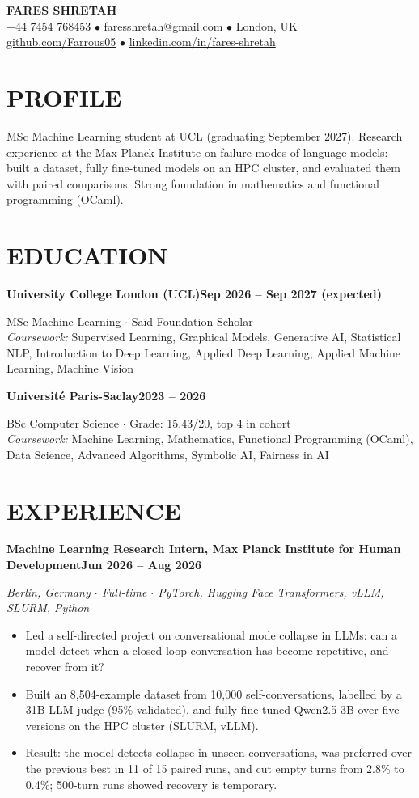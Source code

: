 \documentclass[10pt, a4paper]{article}
\newcommand{\entry}[2]{\vspace{5pt}\textbf{#1}\hfill\textbf{#2}\par}
\newcommand{\sub}[1]{\textit{#1}\par}
\begin{document}
\begin{center}
    {\huge \textbf{FARES SHRETAH}} \\[3pt]
    \small +44 7454 768453 $\bullet$ \href{mailto:faresshretah@gmail.com}{faresshretah@gmail.com} $\bullet$ London, UK \\
    \small \href{https://github.com/Farrous05}{github.com/Farrous05} $\bullet$ \href{https://www.linkedin.com/in/fares-shretah/}{linkedin.com/in/fares-shretah}
\end{center}

\section*{PROFILE}
MSc Machine Learning student at UCL (graduating September 2027). Research experience at the Max Planck Institute on failure modes of language models: built a dataset, fully fine-tuned models on an HPC cluster, and evaluated them with paired comparisons. Strong foundation in mathematics and functional programming (OCaml).

\section*{EDUCATION}
\entry{University College London (UCL)}{Sep 2026 -- Sep 2027 (expected)}
MSc Machine Learning $\cdot$ Sa\"id Foundation Scholar \\
\textit{Coursework:} Supervised Learning, Graphical Models, Generative AI, Statistical NLP, Introduction to Deep Learning, Applied Deep Learning, Applied Machine Learning, Machine Vision

\entry{Universit\'e Paris-Saclay}{2023 -- 2026}
BSc Computer Science $\cdot$ Grade: 15.43/20, top 4 in cohort \\
\textit{Coursework:} Machine Learning, Mathematics, Functional Programming (OCaml), Data Science, Advanced Algorithms, Symbolic AI, Fairness in AI

\section*{EXPERIENCE}
\entry{Machine Learning Research Intern, Max Planck Institute for Human Development}{Jun 2026 -- Aug 2026}
\sub{Berlin, Germany $\cdot$ Full-time $\cdot$ PyTorch, Hugging Face Transformers, vLLM, SLURM, Python}
\begin{itemize}
    \item Led a self-directed project on conversational mode collapse in LLMs: can a model detect when a closed-loop conversation has become repetitive, and recover from it?
    \item Built an 8,504-example dataset from 10,000 self-conversations, labelled by a 31B LLM judge (95\% validated), and fully fine-tuned Qwen2.5-3B over five versions on the HPC cluster (SLURM, vLLM).
    \item Result: the model detects collapse in unseen conversations, was preferred over the previous best in 11 of 15 paired runs, and cut empty turns from 2.8\% to 0.4\%; 500-turn runs showed recovery is temporary.
\end{itemize}
\end{document}
